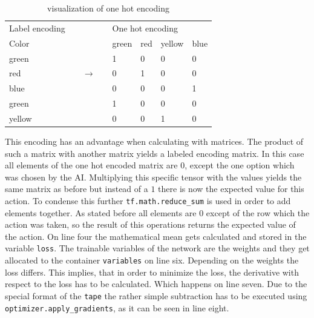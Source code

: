 \documentclass[12pt]{article}
\begin{document}
 \begin{centering}
 \begin{table}[H]
  \caption{visualization of one hot encoding}
\begin{tabular}{lllllllll}
Label encoding               &  &  &  &                       & \multicolumn{4}{l}{One hot encoding}                                                              \\ \cline{1-1} \cline{6-9} 
\multicolumn{1}{|l|}{Color} &
   &
   &
   &
  \multicolumn{1}{l|}{} &
  \multicolumn{1}{l|}{green} &
  \multicolumn{1}{l|}{red} &
  \multicolumn{1}{l|}{yellow} &
  \multicolumn{1}{l|}{blue} \\ \cline{1-1} \cline{6-9} 
\multicolumn{1}{|l|}{green}  &  &  &  & \multicolumn{1}{l|}{} & \multicolumn{1}{l|}{1} & \multicolumn{1}{l|}{0} & \multicolumn{1}{l|}{0} & \multicolumn{1}{l|}{0} \\ \cline{1-1} \cline{6-9} 
\multicolumn{1}{|l|}{red} &
   &
  \multicolumn{2}{l}{$\rightarrow$} &
  \multicolumn{1}{l|}{} &
  \multicolumn{1}{l|}{0} &
  \multicolumn{1}{l|}{1} &
  \multicolumn{1}{l|}{0} &
  \multicolumn{1}{l|}{0} \\ \cline{1-1} \cline{6-9} 
\multicolumn{1}{|l|}{blue}   &  &  &  & \multicolumn{1}{l|}{} & \multicolumn{1}{l|}{0} & \multicolumn{1}{l|}{0} & \multicolumn{1}{l|}{0} & \multicolumn{1}{l|}{1} \\ \cline{1-1} \cline{6-9} 
\multicolumn{1}{|l|}{green}  &  &  &  & \multicolumn{1}{l|}{} & \multicolumn{1}{l|}{1} & \multicolumn{1}{l|}{0} & \multicolumn{1}{l|}{0} & \multicolumn{1}{l|}{0} \\ \cline{1-1} \cline{6-9} 
\multicolumn{1}{|l|}{yellow} &  &  &  & \multicolumn{1}{l|}{} & \multicolumn{1}{l|}{0} & \multicolumn{1}{l|}{0}  & \multicolumn{1}{l|}{1} & \multicolumn{1}{l|}{0} \\ \cline{1-1} \cline{6-9} 
\end{tabular}
\end{table}
 \end{centering}
 This encoding has an advantage when calculating with matrices. The product of such a matrix with another matrix yields a labeled encoding matrix. In this case all elements of the one hot encoded matrix are $0$, except the one option which was chosen by the AI. Multiplying this specific tensor with the values yields the same matrix as before but instead of a $1$ there is now the expected value for this action. To condense this further \lstinline{tf.math.reduce_sum} is used in order to add elements together. As stated before all elements are $0$ except of the row which the action was taken, so the result of this operations returns the expected value of the action.\cite{tf.math.reduce}
 On line four the mathematical mean gets calculated and stored in the variable \lstinline{loss}. The trainable variables of the network are the weights and they get allocated to the container \lstinline{variables} on line six. Depending on the weights the loss differs. This implies, that in order to minimize the loss, the derivative with respect to the loss has to be calculated.  Which happens on line seven. Due to the special format of the \lstinline{tape} the rather simple subtraction has to be executed using \lstinline{optimizer.apply_gradients}, as it can be seen in line eight.\cite{tf.keras.optimizers}
\end{document}
